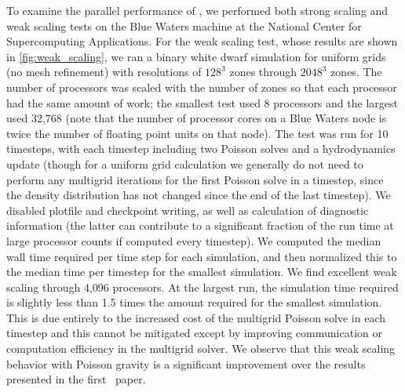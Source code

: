\documentclass[12pt]{article}
\begin{document}
To examine the parallel performance of \castro, we performed both
strong scaling and weak scaling tests on the Blue Waters machine at
the National Center for Supercomputing Applications. For the weak
scaling test, whose results are shown in \autoref{fig:weak_scaling},
we ran a binary white dwarf simulation for uniform grids (no mesh refinement) with resolutions of
$128^3$ zones through $2048^3$ zones. The number of processors was
scaled with the number of zones so that each processor had the same
amount of work; the smallest test used 8 processors and the largest
used 32,768 (note that the number of processor cores on a Blue Waters
node is twice the number of floating point units on that node). The
test was run for 10 timesteps, with each timestep including two
Poisson solves and a hydrodynamics update (though for a uniform grid
calculation we generally do not need to perform any multigrid
iterations for the first Poisson solve in a timestep, since the
density distribution has not changed since the end of the last
timestep). We disabled plotfile and checkpoint writing, as well as
calculation of diagnostic information (the latter can contribute to a
significant fraction of the run time at large processor counts if
computed every timestep). We computed the median wall time required
per time step for each simulation, and then normalized this to the
median time per timestep for the smallest simulation. We find
excellent weak scaling through 4,096 processors. At the largest run,
the simulation time required is slightly less than 1.5 times the amount
required for the smallest simulation.  This is due entirely to the
increased cost of the multigrid Poisson solve in each timestep and
this cannot be mitigated except by improving communication or
computation efficiency in the multigrid solver. We observe that this
weak scaling behavior with Poisson gravity is a significant
improvement over the results presented in the first \castro\ paper.
\end{document}
